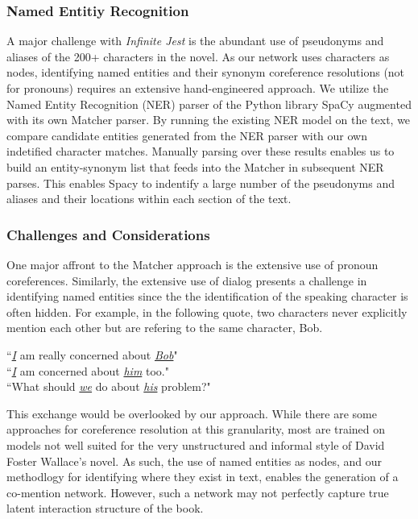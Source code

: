\documentclass[12pt]{article}
\newcommand{\infinitejest}{{\em Infinite Jest}\xspace}
\begin{document}
\subsubsection*{Named Entitiy Recognition}

A major challenge with \infinitejest is the abundant use of pseudonyms and aliases of the 200+ characters in the novel. As our network uses characters as nodes, identifying named entities and their synonym coreference resolutions (not for pronouns) requires an extensive hand-engineered approach. We utilize the Named Entity Recognition (NER) parser of the Python library SpaCy \cite{spacy2} augmented with its own Matcher parser. By running the existing NER model on the text, we compare candidate entities generated from the NER parser with our own indetified character matches. Manually parsing over these results enables us to build an entity-synonym list that feeds into the Matcher in subsequent NER parses. This enables Spacy to indentify a large number of the pseudonyms and aliases and their locations within each section of the text.

\subsubsection*{Challenges and Considerations}
One major affront to the Matcher approach is the extensive use of pronoun coreferences. Similarly, the extensive use of dialog presents a challenge in identifying named entities since the the identification of the speaking character is often hidden. For example, in the following quote, two characters never explicitly mention each other but are refering to the same character, Bob.

\begin{displayquote}
``\emph{\underline{I}} am really concerned about \emph{\underline{Bob}}"\\
``\emph{\underline{I}} am concerned about \emph{\underline{him}} too."\\
``What should \underline{\emph{we}} do about \underline{\emph{his}} problem?"
\end{displayquote}

This exchange would be overlooked by our approach. While there are some approaches for coreference resolution at this granularity, most are trained on models not well suited for the very unstructured and informal style of David Foster Wallace's novel.  As such, the use of named entities as nodes, and our methodlogy for identifying where they exist in text, enables the generation of a co-mention network. However, such a network may not perfectly capture true latent interaction structure of the book.
\end{document}
